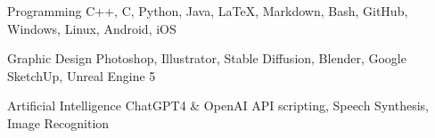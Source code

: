 


\begin{cvskills}


  \cvskill
    {Programming} %
    {C++, C, Python, Java, LaTeX, Markdown, Bash, GitHub, Windows, Linux, Android, iOS} %

  \cvskill
    {Graphic Design} %
    {Photoshop, Illustrator, Stable Diffusion, Blender, Google SketchUp, Unreal Engine 5} %

  \cvskill
    {Artificial Intelligence} %
	{ChatGPT4 \& OpenAI API scripting, Speech Synthesis, Image Recognition} %


\end{cvskills}
